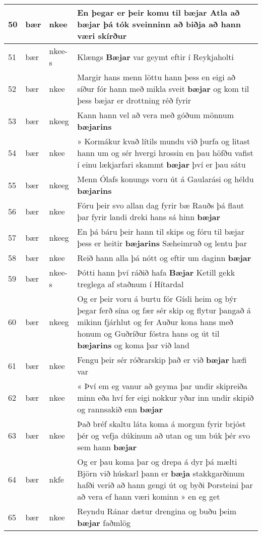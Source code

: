 \documentclass{article}
\begin{document}
\begin{longtable}{p{1cm}|p{1cm}|p{1cm}|p{13cm}}
\hline
50&bær&nkee&En þegar er þeir komu til bæjar Atla að \textbf{bæjar} þá tók sveinninn að biðja að hann væri skírður\\
\hline
51&bær&nkee-s&Klængs \textbf{Bæjar} var geymt eftir í Reykjaholti\\
\hline
52&bær&nkee&Margir hans menn löttu hann þess en eigi að síður fór hann með mikla sveit \textbf{bæjar} og kom til þess bæjar er drottning réð fyrir\\
\hline
53&bær&nkeeg&Kann hann vel að vera með góðum mönnum \textbf{bæjarins} \\
\hline
54&bær&nkee&» Kormákur kvað lítils mundu við þurfa og litast hann um og sér hvergi hrossin en þau höfðu vafist í einu lækjarfari skammt \textbf{bæjar} því er þau sátu\\
\hline
55&bær&nkeeg&Menn Ólafs konungs voru út á Gaularási og héldu \textbf{bæjarins} \\
\hline
56&bær&nkee&Fóru þeir svo allan dag fyrir bæ Rauðs þá flaut þar fyrir landi dreki hans sá hinn \textbf{bæjar} \\
\hline
57&bær&nkeeg&En þá báru þeir hann til skips og fóru til bæjar þess er heitir \textbf{bæjarins} Sæheimruð og lentu þar\\
\hline
58&bær&nkee&Reið hann alla þá nótt og eftir um daginn \textbf{bæjar} \\
\hline
59&bær&nkee-s&Þótti hann því ráðið hafa \textbf{Bæjar} Ketill gekk treglega af staðnum í Hítardal\\
\hline
60&bær&nkeeg&Og er þeir voru á burtu fór Gísli heim og býr þegar ferð sína og fær sér skip og flytur þangað á mikinn fjárhlut og fer Auður kona hans með honum og Guðríður fóstra hans og út til \textbf{bæjarins} og koma þar við land\\
\hline
61&bær&nkee&Fengu þeir sér róðrarskip það er við \textbf{bæjar} hæfi var\\
\hline
62&bær&nkee&« Því em eg vanur að geyma þar undir skipreiða minn eða hví fer eigi nokkur yðar inn undir skipið og rannsakið enn \textbf{bæjar} \\
\hline
63&bær&nkee&Það bréf skaltu láta koma á morgun fyrir brjóst þér og vefja dúkinum að utan og um búk þér svo sem hann \textbf{bæjar} \\
\hline
64&bær&nkfe&Og er þau koma þar og drepa á dyr þá mælti Björn við húskarl þann er \textbf{bæja} stakkgarðinum hafði verið að hann gengi út og byði Þorsteini þar að vera ef hann væri kominn » en eg get\\
\hline
65&bær&nkee&Reyndu Ránar dætur drengina og buðu þeim \textbf{bæjar} faðmlög\\

\end{longtable}
\end{document}
